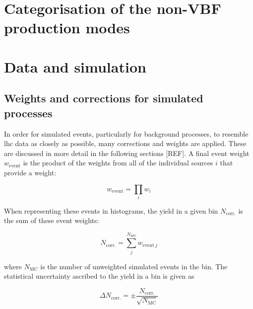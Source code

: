 

\section{Categorisation of the non-VBF production modes}
\label{sec:htoinv_categorisation}




\section{Data and simulation}
\label{sec:htoinv_data_sim}




\subsection{Weights and corrections for simulated processes}
\label{subsec:htoinv_mc_corrections}

In order for simulated events, particularly for background processes, to resemble \acrshort{lhc} data as closely as possible, many corrections and weights are applied. These are discussed in more detail in the following sections [REF]. A final event weight $w_{\mathrm{event}}$ is the product of the weights from all of the individual sources $i$ that provide a weight:

\begin{equation}
\label{eq:event_weight}
w_{\mathrm{event}} = \prod_i w_i
\end{equation}

When representing these events in histograms, the yield in a given bin $N_{\mathrm{corr.}}$ is the sum of these event weights:

\begin{equation}
\label{eq:bin_weight}
N_{\mathrm{corr.}} = \sum_j^{N_{\mathrm{MC}}} w_{\mathrm{event} \ j}
\end{equation}

where $N_{\mathrm{MC}}$ is the number of unweighted simulated events in the bin. The statistical uncertainty ascribed to the yield in a bin is given as

\begin{equation}
\Delta N_{\mathrm{corr.}} = \pm \frac{ N_{\mathrm{corr.}} }{ \sqrt{N_{\mathrm{MC}}} }
\label{eq:uncertainty_mc_ours}
\end{equation}

